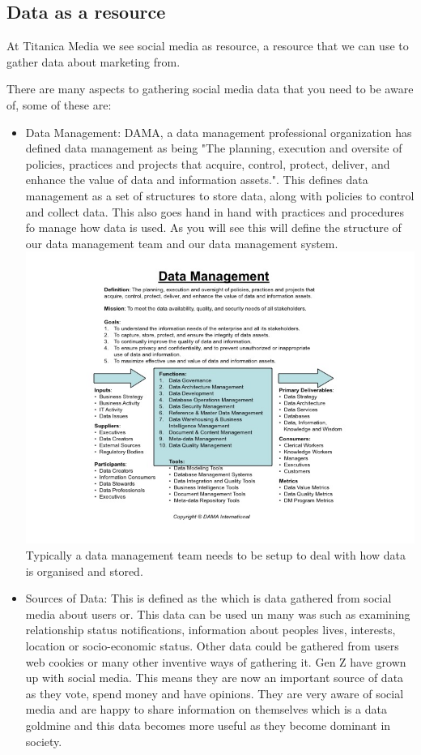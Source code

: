 \documentclass{article}
\begin{document}
\subsection{Data as a resource}
At Titanica Media we see social media as resource, a resource that we can use to gather data about marketing from.

There are many aspects to gathering social media data that you need to be aware of, some of these are:
\begin{itemize}
\item Data Management: DAMA, a data management professional organization has defined data management as being "The planning, execution and oversite of policies, practices and projects that acquire, control, protect, deliver, and enhance the value of data and information assets.". This defines data management as a set of structures to store data, along with policies to control and collect data. This also goes hand in hand with practices and procedures fo manage how data is used. As you will see this will define the structure of our data management team and our data management system.  \cite{dama}\\
\includegraphics[scale=0.5]{datamanagement} \\
Typically a data management team needs to be setup to deal with how data is organised and stored. 
\item Sources of Data: This is defined as the which is data gathered from social media about users or. This data can be used un many was such as examining relationship status notifications, information about peoples lives, interests, location or socio-economic status. Other data could be gathered from users web cookies or many other inventive ways of gathering it. Gen Z\cite{genz} have grown up with social media. This means they are now an important source of data as they vote, spend money and have opinions. They are very aware of social media and are happy to share information on themselves which is a data goldmine and this data becomes more useful as they become dominant in society.

\end{itemize}
\end{document}
